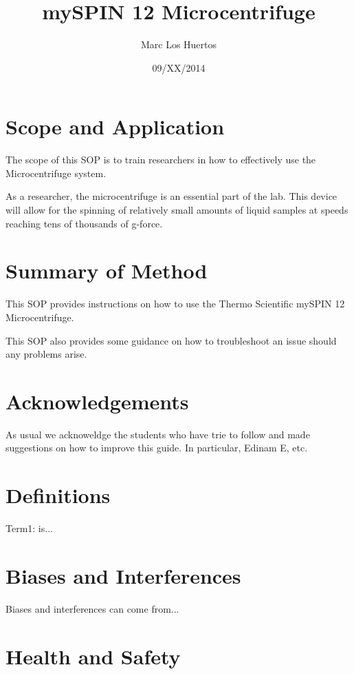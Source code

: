 \documentclass[12pt]{../SOP3_beta}
\title{mySPIN 12 Microcentrifuge}
\date{09/XX/2014}
\author{Marc Los Huertos}
\begin{document}


\maketitle

\section{Scope and Application}

\NP The scope of this SOP is to train researchers in how to effectively use the Microcentrifuge system.

\NP As a researcher, the microcentrifuge is an essential part of the lab. This device will allow for the spinning of relatively small amounts of liquid samples at speeds reaching tens of thousands of g-force. 

\section{Summary of Method}

\NP This SOP provides instructions on how to use the Thermo Scientific mySPIN 12 Microcentrifuge. 

\NP This SOP also provides some guidance on how to troubleshoot an issue should any problems arise. 

\tableofcontents

\newpage

\section{Acknowledgements}

\NP As usual we acknoweldge the students who have trie to follow and made suggestions on how to improve this guide. In particular, Edinam E, etc.

\section{Definitions}


\NP Term1: is...

\section{Biases and Interferences}

\NP Biases and interferences can come from...

\section{Health and Safety}
\end{document}

